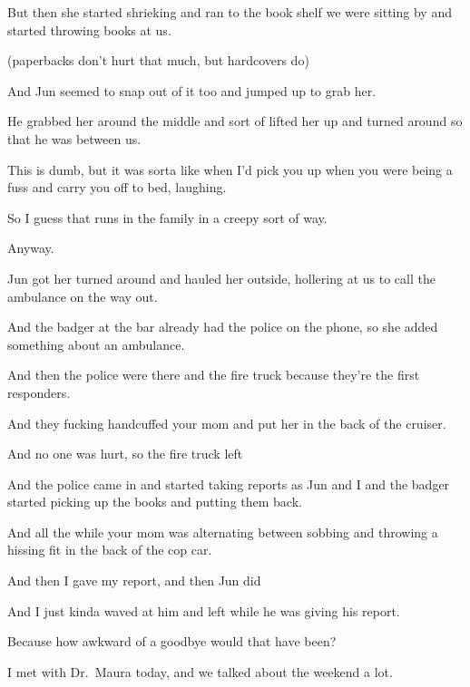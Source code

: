 { But then she started shrieking and ran to the book shelf we were sitting by and started throwing books at us.

(paperbacks don't hurt that much, but hardcovers do)

 And Jun seemed to snap out of it too and jumped up to grab her.

 He grabbed her around the middle and sort of lifted her up and turned around so that he was between us.

 This is dumb, but it was sorta like when I'd pick you up when you were being a fuss and carry you off to bed, laughing.

 So I guess that runs in the family in a creepy sort of way.

 Anyway.

 Jun got her turned around and hauled her outside, hollering at us to call the ambulance on the way out.

 And the badger at the bar already had the police on the phone, so she added something about an ambulance.

 And then the police were there and the fire truck because they're the first responders.

 And they fucking handcuffed your mom and put her in the back of the cruiser.

 And no one was hurt, so the fire truck left

 And the police came in and started taking reports as Jun and I and the badger started picking up the books and putting them back.

 And all the while your mom was alternating between sobbing and throwing a hissing fit in the back of the cop car.

 And then I gave my report, and then Jun did

 And I just kinda waved at him and left while he was giving his report.

 Because how awkward of a goodbye would that have been?

 I met with Dr.~Maura today, and we talked about the weekend a lot.

}
